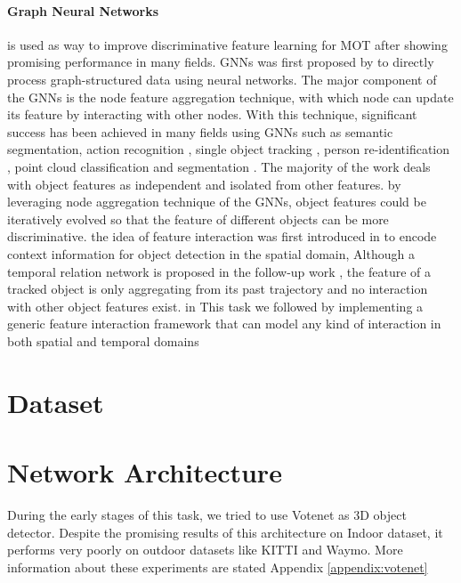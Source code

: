 \documentclass[10pt,twocolumn,letterpaper]{article}
\begin{document}
\paragraph{Graph Neural Networks} is used as way to improve discriminative feature learning for MOT after showing promising performance in many fields\cite{hamilton2017inductive,velivckovic2017graph,kipf2016semi, berg2017graph, monti2017geometric, ying2018graph}. GNNs was first proposed by \cite{gori2005new} to directly process graph-structured data using neural networks. The major component of the GNNs is the node feature aggregation technique, with which node can update its feature by interacting with other nodes. With this technique, significant success has been achieved in many fields using GNNs such as semantic segmentation\cite{chen2019graph}, action recognition \cite{shi2019skeleton}, single object tracking \cite{gao2019graph}, person re-identification \cite{wu2019unsupervised}, point cloud classification and segmentation \cite{wang2019dynamic}. The majority of the work deals with object features as independent and isolated from other features. by leveraging node aggregation technique of the GNNs, object features could be iteratively evolved so that the feature of different objects can be more discriminative. the idea of feature interaction was first introduced in \cite{hu2018relation} to encode context information for object detection in the spatial domain, Although a temporal relation network is proposed in the follow-up work \cite{xu2019spatial}, the feature of a tracked object is only aggregating from its past trajectory and no interaction with other object features exist. in This task we followed \cite{yin2020center} by implementing a generic feature interaction framework that can model any kind of interaction in both spatial and temporal domains



\section{Dataset}


\section{Network Architecture}

During the early stages of this task, we tried to use Votenet \cite{qi2019deep} as 3D object detector. Despite the promising results of this architecture on Indoor dataset, it performs very poorly on outdoor datasets like KITTI and Waymo. More information about these experiments are stated Appendix \ref{appendix:votenet}
\end{document}
